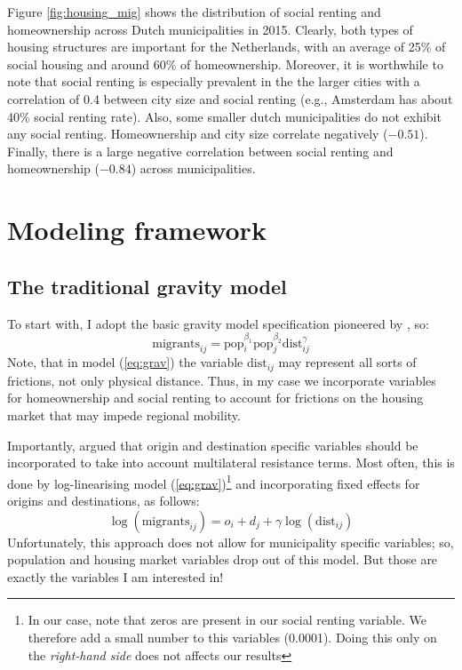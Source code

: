\documentclass[12pt, parskip, abstracton,notitlepage]{scrartcl}
\begin{document}
Figure \ref{fig:housing_mig} shows the distribution of social
renting and homeownership across Dutch municipalities in 2015.
Clearly, both types of housing structures are important for
the Netherlands, with an average of 25\% of social housing and
around 60\% of homeownership. Moreover, it is worthwhile to
note that social renting is especially prevalent in the the
larger cities with a correlation of 0.4 between city size and
social renting (e.g., Amsterdam has about 40\% social renting
rate). Also, some smaller dutch municipalities do not exhibit
any social renting. Homeownership and city size correlate
negatively ($-0.51$). Finally, there is a large negative
correlation between social renting and homeownership ($-0.84$) across municipalities.

\section{Modeling framework}

\subsection{The traditional gravity model}

To start with, I adopt the basic gravity model specification pioneered by
\citet{tinbergen1962shaping}, so:
\begin{equation}
\text{migrants}_{ij} = \text{pop}_i^{\beta_1}\text{pop}_j^{\beta_2}\text{dist}_{ij}^\gamma
\label{eq:grav}
\end{equation}
Note, that in model (\ref{eq:grav}) the variable
$\text{dist}_{ij}$ may represent all sorts of frictions, not
only physical distance. Thus, in my case we incorporate
variables for homeownership and social renting to account for
frictions on the housing market that may impede regional
mobility.

Importantly, \citet{anderson2003gravity} argued that origin
and destination specific variables should be incorporated to
take into account multilateral resistance terms. Most often,
this is done by log-linearising model
(\ref{eq:grav})\footnote{In our case, note that zeros are
	present in our social renting variable. We therefore add a
	small number to this variables (0.0001). Doing this only on
	the \emph{right-hand side} does not affects our results} and
incorporating fixed effects for origins and destinations, as
follows:
\begin{equation}
\log(\text{migrants}_{ij}) = o_i + d_j +  \gamma\log(\text{dist}_{ij})
\label{eq:gravfixed}
\end{equation} 
Unfortunately, this approach does not allow for municipality
specific variables; so, population and housing market
variables drop out of this model. But those are exactly the
variables I am  interested in!
\end{document}
